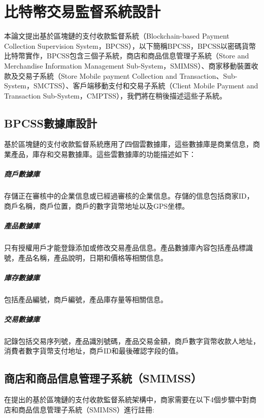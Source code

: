 
\chapter{比特幣交易監督系統設計}
本論文提出基於區塊鏈的支付收款監督系統（Blockchain-based Payment Collection Supervision System，BPCSS），以下簡稱BPCSS，BPCSS以密碼貨幣比特幣實作，BPCSS包含三個子系統，商店和商品信息管理子系統（Store and Merchandise Information Management Sub-System，SMIMSS）、商家移動裝置收款及交易子系統（Store Mobile payment Collection and Transaction、Sub-System，SMCTSS）、客戶端移動支付和交易子系統（Client Mobile Payment and Transaction Sub-System，CMPTSS），我們將在稍後描述這些子系統。

	\section{BPCSS數據庫設計}
	基於區塊鏈的支付收款監督系統應用了四個雲數據庫，這些數據庫是商業信息，商業產品，庫存和交易數據庫。這些雲數據庫的功能描述如下：

		\paragraph{商戶數據庫}存儲正在審核中的企業信息或已經過審核的企業信息。存儲的信息包括商家ID，商戶名稱，商戶位置，商戶的數字貨幣地址以及GPS坐標。
		\paragraph{產品數據庫}只有授權用戶才能登錄添加或修改交易產品信息。產品數據庫內容包括產品標識號，產品名稱，產品說明，日期和價格等相關信息。
		\paragraph{庫存數據庫}包括產品編號，商戶編號，產品庫存量等相關信息。
		\paragraph{交易數據庫}記錄包括交易序列號，產品識別號碼，產品交易金額，商戶數字貨幣收款人地址，消費者數字貨幣支付地址，商戶ID和最後確認字段的值。

	\section{商店和商品信息管理子系統（SMIMSS）}
	在提出的基於區塊鏈的支付收款監督系統架構中，商家需要在以下4個步驟中對商店和商品信息管理子系統（SMIMSS）進行註冊:
